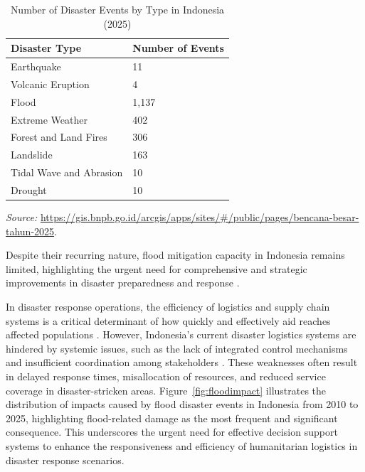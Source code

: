\documentclass[journal,final,a4paper,twoside,11pt]{IEEEtran}
\begin{document}
\begin{table}[H]
\caption{Number of Disaster Events by Type in Indonesia (2025)}
\begin{center}
\begin{tabular}{|l|p{2cm}|}
\hline
\textbf{Disaster Type} & \textbf{Number of Events} \\
\hline
Earthquake & 11 \\
\hline
Volcanic Eruption & 4 \\
\hline
Flood & 1,137 \\
\hline
Extreme Weather & 402 \\
\hline
Forest and Land Fires & 306 \\
\hline
Landslide & 163 \\
\hline
Tidal Wave and Abrasion & 10 \\
\hline
Drought & 10 \\
\hline
\end{tabular}
\end{center}
\vspace{0.2cm}
\footnotesize{\textit{Source:} \url{https://gis.bnpb.go.id/arcgis/apps/sites/#/public/pages/bencana-besar-tahun-2025}.}
\label{tab:disaster2025}
\end{table}

Despite their recurring nature, flood mitigation capacity in Indonesia remains limited, highlighting the urgent need for comprehensive and strategic improvements in disaster preparedness and response \cite{riza2020advancing}.

In disaster response operations, the efficiency of logistics and supply chain systems is a critical determinant of how quickly and effectively aid reaches affected populations \cite{ma2022critical}. However, Indonesia's current disaster logistics systems are hindered by systemic issues, such as the lack of integrated control mechanisms and insufficient coordination among stakeholders \cite{rustian2021implementation}. These weaknesses often result in delayed response times, misallocation of resources, and reduced service coverage in disaster-stricken areas. Figure~\ref{fig:floodimpact} illustrates the distribution of impacts caused by flood disaster events in Indonesia from 2010 to 2025, highlighting flood-related damage as the most frequent and significant consequence. This underscores the urgent need for effective decision support systems to enhance the responsiveness and efficiency of humanitarian logistics in disaster response scenarios.
\end{document}
